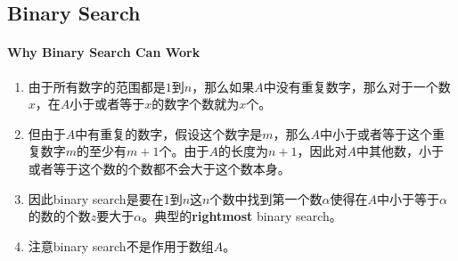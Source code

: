 \subsection{Binary Search}
\paragraph{Why Binary Search Can Work}
\begin{enumerate}
\item 由于所有数字的范围都是$1$到$n$，那么如果$A$中没有重复数字，那么对于一个数$x$，在$A$小于或者等于$x$的数字个数就为$x$个。
\item 但由于$A$中有重复的数字，假设这个数字是$m$，那么$A$中小于或者等于这个重复数字$m$的至少有$m+1$个。由于$A$的长度为$n+1$，因此对$A$中其他数，小于或者等于这个数的个数都不会大于这个数本身。
\item 因此binary search是要在$1$到$n$这$n$个数中找到第一个数$\alpha$使得在$A$中小于等于$\alpha$的数的个数$z$要大于$\alpha$。典型的\textbf{rightmost} binary search。
\item 注意binary search不是作用于数组$A$。
\end{enumerate}
